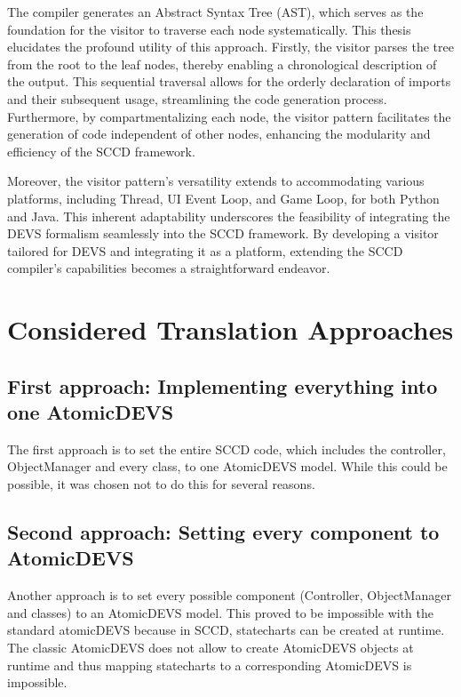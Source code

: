 The compiler generates an Abstract Syntax Tree (AST), which serves as the foundation for the visitor to traverse each node systematically. This thesis elucidates the profound utility of this approach. Firstly, the visitor parses 
the tree from the root to the leaf nodes, thereby enabling a chronological description of the output. This sequential traversal allows for the orderly declaration of imports and their subsequent usage, streamlining the code 
generation process. Furthermore, by compartmentalizing each node, the visitor pattern facilitates the generation of code independent of other nodes, enhancing the modularity and efficiency of the SCCD framework.

Moreover, the visitor pattern's versatility extends to accommodating various platforms, including Thread, UI Event Loop, and Game Loop, for both Python and Java. This inherent adaptability underscores the feasibility of integrating 
the DEVS formalism seamlessly into the SCCD framework. By developing a visitor tailored for DEVS and integrating it as a platform, extending the SCCD compiler's capabilities becomes a straightforward endeavor.



\section{Considered Translation Approaches}

\subsection{First approach: Implementing everything into one AtomicDEVS}
The first approach is to set the entire SCCD code, which includes the controller, ObjectManager and every class, to one AtomicDEVS model. While this could be possible, it was chosen not to do this for several reasons.

\subsection{Second approach: Setting every component to AtomicDEVS}
Another approach is to set every possible component (Controller, ObjectManager and classes) to an AtomicDEVS model. This proved to be impossible with the standard
atomicDEVS because in SCCD, statecharts can be created at runtime. The classic AtomicDEVS does not allow to create AtomicDEVS objects at runtime and thus mapping statecharts
to a corresponding AtomicDEVS is impossible.


